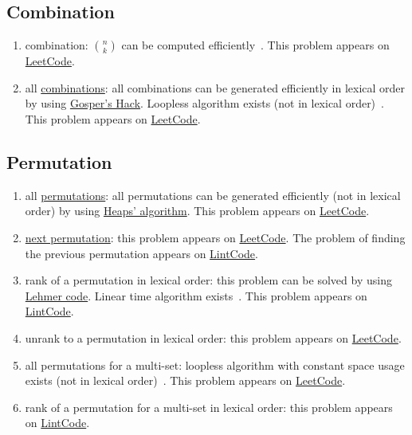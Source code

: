 \subsection{Combination}
\begin{enumerate}
\item combination: $n\choose{k}$ can be computed efficiently~\cite{Manolopoulos02}. This problem appears on \href{https://leetcode.com/problems/unique-paths/}{LeetCode}.
\item all \href{https://en.wikipedia.org/wiki/Combination}{combinations}: all combinations can be generated efficiently in lexical order by using \href{https://en.wikipedia.org/wiki/Combinatorial_number_system#Applications}{Gosper's Hack}. Loopless algorithm exists (not in lexical order)~\cite{Ruskey2009}. This problem appears on \href{https://leetcode.com/problems/combinations/}{LeetCode}.
\end{enumerate}

\subsection{Permutation}
\begin{enumerate}
\item all \href{https://en.wikipedia.org/wiki/Permutation}{permutations}: all permutations can be generated efficiently (not in lexical order) by using \href{https://en.wikipedia.org/wiki/Heap\%27s_algorithm}{Heaps' algorithm}. This problem appears on \href{https://leetcode.com/problems/permutations/}{LeetCode}.
\item \href{https://en.wikipedia.org/wiki/Permutation#Generation_in_lexicographic_order}{next permutation}: this problem appears on \href{https://leetcode.com/problems/next-permutation/}{LeetCode}. The problem of finding the previous permutation appears on \href{http://www.lintcode.com/en/problem/previous-permutation/}{LintCode}.
\item rank of a permutation in lexical order: this problem can be solved by using \href{https://en.wikipedia.org/wiki/Lehmer_code#Encoding_and_decoding}{Lehmer code}. Linear time algorithm exists~\cite{Mares2007}. This problem appears on \href{http://www.lintcode.com/en/problem/permutation-index/}{LintCode}. 
\item unrank to a permutation in lexical order: this problem appears on \href{https://leetcode.com/problems/permutation-sequence/}{LeetCode}.
\item all permutations for a multi-set: loopless algorithm with constant space usage exists (not in lexical order)~\cite{Williams2009}. This problem appears on \href{https://leetcode.com/problems/permutations-ii/}{LeetCode}.
\item rank of a permutation for a multi-set in lexical order: this problem appears on \href{http://www.lintcode.com/en/problem/permutation-index-ii/}{LintCode}.
\end{enumerate}

